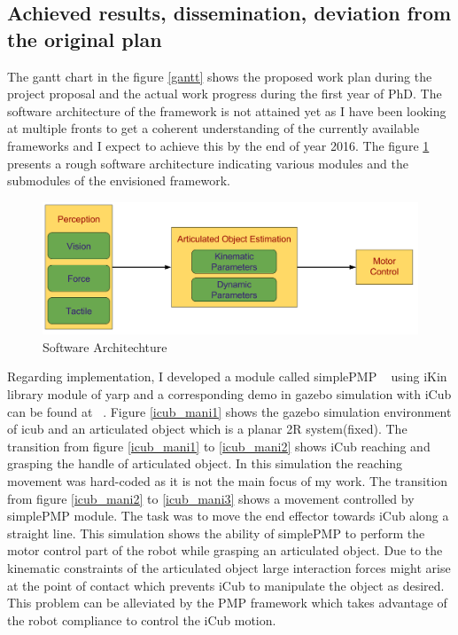 \documentclass[12pt,a4paper]{report}
\begin{document}
\subsection{Achieved results, dissemination, deviation from the original plan}
The gantt chart in the figure \ref{gantt} shows the proposed work plan during the project proposal and the actual work progress during the first year of PhD. The software architecture of the framework is not attained yet as I have been looking at multiple fronts to get a coherent understanding of the currently available frameworks and I expect to achieve this by the end of year 2016. The figure \ref{SoftArc} presents a rough software architecture indicating various modules and the submodules of the envisioned framework.

\begin{figure}[!ht]
	\centering
	\includegraphics[scale=0.3]{figures/SoftwareArch_year1.png}
	\caption{Software Architechture}		
	\label{SoftArc}
\end{figure}

Regarding implementation, I developed a module called simplePMP ~\cite{Tirupachuri:2016:Online} using iKin library module of yarp and a corresponding demo in gazebo simulation with iCub can be found at ~\cite{simplePMP_Demo:2016:Online}. Figure \ref{icub_mani1} shows the gazebo simulation environment of icub and an articulated object which is a planar 2R system(fixed). The transition from figure \ref{icub_mani1} to \ref{icub_mani2} shows iCub reaching and grasping the handle of articulated object. In this simulation the reaching movement was hard-coded as it is not the main focus of my work. The transition from figure \ref{icub_mani2} to \ref{icub_mani3} shows a movement controlled by simplePMP module. The task was to move the end effector towards iCub along a straight line. This simulation shows the ability of simplePMP to perform the motor control part of the robot while grasping an articulated object. Due to the kinematic constraints of the articulated object large interaction forces might arise at the point of contact which prevents iCub to manipulate the object as desired. This problem can be alleviated by the PMP framework which takes advantage of the robot compliance to control the iCub motion.  
\end{document}
